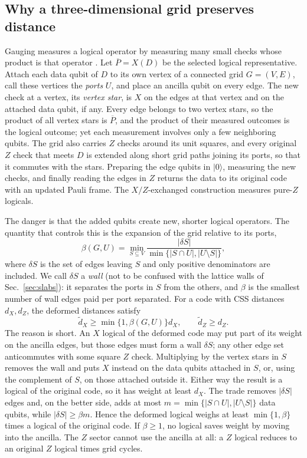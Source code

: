 \subsection{Why a three-dimensional grid preserves distance}
Gauging measures a logical operator by measuring many small checks whose
product is that operator \cite{WilliamsonYoderGauging}.  Let
$\overline P=X(D)$ be the selected logical representative.  Attach each data
qubit of $D$ to its own vertex of a connected grid $G=(V,E)$, call these
vertices the \emph{ports} $U$, and place an ancilla qubit on every edge.  The
new check at a vertex, its \emph{vertex star}, is $X$ on the edges at that
vertex and on the attached data qubit, if any.  Every edge belongs to two
vertex stars, so the product of all vertex stars is $\overline P$, and the
product of their measured outcomes is the logical outcome; yet each
measurement involves only a few neighboring qubits.  The grid also carries
$Z$ checks around its unit squares, and every original $Z$ check that meets
$D$ is extended along short grid paths joining its ports, so that it commutes
with the stars.  Preparing the edge qubits in $|0\rangle$, measuring the new
checks, and finally reading the edges in $Z$ returns the data to its original
code with an updated Pauli frame.  The $X/Z$-exchanged construction measures
pure-$Z$ logicals.

The danger is that the added qubits create new, shorter logical operators.
The quantity that controls this is the expansion of the grid relative to its
ports,
\begin{equation}
 \beta(G,U)=\min_{S\subseteq V}
 \frac{|\delta S|}{\min\{|S\cap U|,|U\setminus S|\}},
 \label{eq:beta}
\end{equation}
where $\delta S$ is the set of edges leaving $S$ and only positive
denominators are included.  We call $\delta S$ a \emph{wall} (not to be
confused with the lattice walls of Sec.~\ref{sec:slabs}): it separates
the ports in $S$ from the others, and $\beta$ is the smallest number of wall
edges paid per port separated.  For a code with CSS distances $d_X,d_Z$, the
deformed distances satisfy
\begin{equation}
 \widetilde d_X\ge\min\{1,\beta(G,U)\}d_X,
 \qquad \widetilde d_Z\ge d_Z.
 \label{eq:gauge-distance}
\end{equation}
The reason is short.  An $X$ logical of the deformed code may put part of its
weight on the ancilla edges, but those edges must form a wall $\delta S$;
any other edge set anticommutes with some square $Z$ check.  Multiplying by
the vertex stars in $S$ removes the wall and puts $X$ instead on the data
qubits attached in $S$, or, using the complement of $S$, on those attached
outside it.  Either way the result is a logical of the original code, so it
has weight at least $d_X$.  The trade removes $|\delta S|$ edges and, on the
better side, adds at most $m=\min\{|S\cap U|,|U\setminus S|\}$ data qubits,
while $|\delta S|\ge\beta m$.  Hence the deformed logical weighs at least
$\min\{1,\beta\}$ times a logical of the original code.  If $\beta\ge1$, no
logical saves weight by moving into the ancilla.  The $Z$ sector cannot use the ancilla at
all: a $Z$ logical reduces to an original $Z$ logical times grid cycles.

